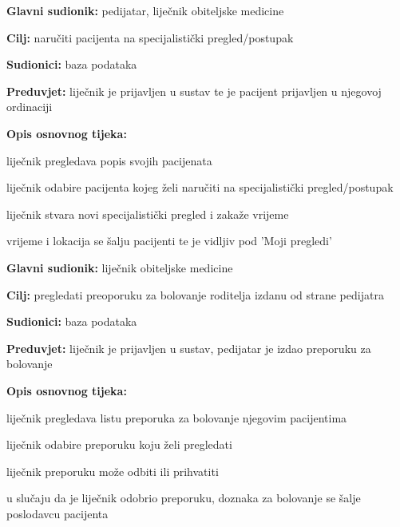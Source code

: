      
                    \noindent {}
					\begin{packed_item}
	
						\item \textbf{Glavni sudionik: }pedijatar, liječnik obiteljske medicine
						\item  \textbf{Cilj:} naručiti pacijenta na specijalistički pregled/postupak
						\item  \textbf{Sudionici:} baza podataka
						\item  \textbf{Preduvjet:} liječnik je prijavljen u sustav te je pacijent prijavljen u njegovoj ordinaciji
						\item  \textbf{Opis osnovnog tijeka:}
						
						\item[] \begin{packed_enum}
	
							\item liječnik pregledava popis svojih pacijenata
							\item liječnik odabire pacijenta kojeg želi naručiti na specijalistički pregled/postupak
							\item liječnik stvara novi specijalistički pregled i zakaže vrijeme
                            \item vrijeme i lokacija se šalju pacijenti te je vidljiv pod 'Moji pregledi'

						\end{packed_enum}
					\end{packed_item}


                     \noindent {}
					\begin{packed_item}
	
						\item \textbf{Glavni sudionik: }liječnik obiteljske medicine
						\item  \textbf{Cilj:} pregledati preoporuku za bolovanje roditelja izdanu od strane pedijatra
						\item  \textbf{Sudionici:} baza podataka
						\item  \textbf{Preduvjet:} liječnik je prijavljen u sustav, pedijatar je izdao preporuku za bolovanje
						\item  \textbf{Opis osnovnog tijeka:}
						
						\item[] \begin{packed_enum}
	
							\item liječnik pregledava listu preporuka za bolovanje njegovim pacijentima
							\item liječnik odabire preporuku koju želi pregledati
							\item liječnik preporuku može odbiti ili prihvatiti
                            \item u slučaju da je liječnik odobrio preporuku, doznaka za bolovanje se šalje poslodavcu pacijenta

						\end{packed_enum}
					\end{packed_item}

